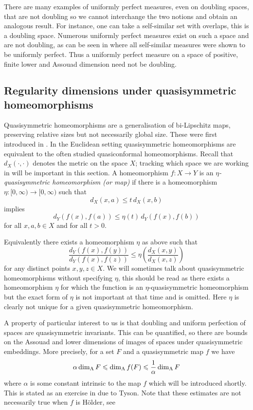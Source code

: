 There are many examples of uniformly perfect measures, even on doubling spaces, that are not doubling so we cannot interchange the two notions and obtain an analogous result.  For instance, one can take a self-similar set with overlaps, this is a doubling space. Numerous uniformly perfect measures exist on such a space and are not doubling, as can be seen in \cite{hare-troscheit} where all self-similar measures were shown to be uniformly perfect. Thus a uniformly perfect measure on a space of positive, finite lower and Assouad dimension need not be doubling.




\subsection{Regularity dimensions under quasisymmetric homeomorphisms}\label{ch-quantifying:sec:quasi}


Quasisymmetric homeomorphisms are a generalisation of bi-Lipschitz maps, preserving relative sizes but not necessarily global size. These were first introduced in \cite{ahlfors-beurling, tukia-vaisala}. In the Euclidean setting quasisymmetric homeomorphisms are equivalent to the often studied quasiconformal homeomorphisms. Recall that $d_X(\cdot,\cdot)$ denotes the metric on the space $X$; tracking which space we are working in will be important in this section. A homeomorphism $f\colon X \rightarrow Y$ is an \textit{$\eta$-quasisymmetric homeomorphism (or map)} if there is a homeomorphism $\eta \colon [0,\infty) \rightarrow [0,\infty)$ such that 
\[
d_X( x , a ) \le t \, d_X( x , b )
\]
implies 
\[
d_Y( f(x) , f(a) ) \le \eta(t) \, d_Y ( f(x) , f(b) )
\]
for all $x,a,b \in X$ and for all $t>0$.

Equivalently there exists a homeomorphism $\eta$ as above such that 
\[
\frac{d_Y(f(x),f(y))}{d_Y(f(x),f(z))} \le \eta \left(\frac{d_X(x,y)}{d_X(x,z)} \right)
\]
for any distinct points $x,y,z \in X$. We will sometimes talk about quasisymmetric homeomorphisms without specifying $\eta$, this should be read as there exists a homeomorphism $\eta$ for which the function is an $\eta$-quasisymmetric homeomorphism but the exact form of $\eta$ is not important at that time and is omitted. Here $\eta$ is clearly not unique for a given quasisymmetric homeomorphism. 


A property of particular interest to us is that doubling and uniform perfection of spaces are quasisymmetric invariants. This can be quantified, so there are bounds on the Assouad and lower dimensions of images of spaces under quasisymmetric embeddings. More precisely, for a set $F$ and a quasisymmetric map $f$ we have
\[
\alpha \dim_{\textup{A}} F \leqslant \dim_{\textup{A}} f(F) \leqslant \frac{1}{\alpha} \dim_{\textup{A}} F
\]
where $\alpha$ is some constant intrinsic to the map $f$ which will be introduced shortly. This is stated as an exercise in \cite{heinonen} due to Tyson. Note that these estimates are not necessarily true when $f$ is H\"older, see \cite{luk}

